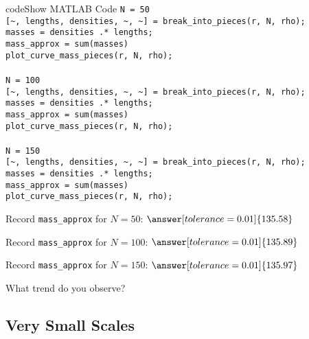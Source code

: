 \documentclass{ximera}
\begin{document}
\begin{expandable}{code}{Show MATLAB Code}
\texttt{N = 50}\\
\texttt{[\textasciitilde, lengths, densities, \textasciitilde, \textasciitilde] = break\_into\_pieces(r, N, rho);}\\
\texttt{masses = densities .* lengths;}\\
\texttt{mass\_approx = sum(masses)}\\
\texttt{plot\_curve\_mass\_pieces(r, N, rho);}\\
\\
\texttt{N = 100}\\
\texttt{[\textasciitilde, lengths, densities, \textasciitilde, \textasciitilde] = break\_into\_pieces(r, N, rho);}\\
\texttt{masses = densities .* lengths;}\\
\texttt{mass\_approx = sum(masses)}\\
\texttt{plot\_curve\_mass\_pieces(r, N, rho);}\\
\\
\texttt{N = 150}\\
\texttt{[\textasciitilde, lengths, densities, \textasciitilde, \textasciitilde] = break\_into\_pieces(r, N, rho);}\\
\texttt{masses = densities .* lengths;}\\
\texttt{mass\_approx = sum(masses)}\\
\texttt{plot\_curve\_mass\_pieces(r, N, rho);}
\end{expandable}

\begin{problem}
Record \texttt{mass\_approx} for $N=50$: $\answer[tolerance=0.01]{135.58}$

Record \texttt{mass\_approx} for $N=100$: $\answer[tolerance=0.01]{135.89}$

Record \texttt{mass\_approx} for $N=150$: $\answer[tolerance=0.01]{135.97}$

What trend do you observe? \begin{multipleChoice}
\end{multipleChoice}
\end{problem}

\subsection*{Very Small Scales}
\end{document}
